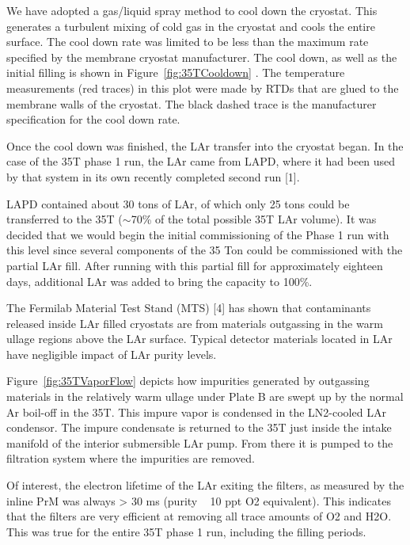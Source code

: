 We have adopted a gas/liquid spray method to cool down the cryostat. This generates a turbulent mixing 
of cold gas in the cryostat and cools the entire surface. The cool down rate was limited to be less than 
the maximum rate specified by the membrane cryostat manufacturer. The cool down, as well as the initial 
filling is shown in Figure~\ref{fig:35TCooldown} . The temperature measurements (red traces) in this plot 
were made by RTDs that are glued to the membrane walls of the cryostat. The black dashed trace is the 
manufacturer specification for the cool down rate.

Once the cool down was finished, the LAr transfer into the cryostat began. In the case of the 35T phase 1 
run, the LAr came from LAPD, where it had been used by that system in its own recently completed 
second run [1]\fixme{}. 

LAPD contained about 30 tons of LAr, of which only 25 tons could be transferred to the 35T ($\sim$70\% of 
the total possible 35T LAr volume). It was decided that we would begin the initial commissioning of the 
Phase 1 run with this level since several components of the 35 Ton could be commissioned with the 
partial LAr fill. After running with this partial fill for approximately eighteen days, additional LAr was 
added to bring the capacity to 100\%. 


The Fermilab Material Test Stand (MTS) [4]\fixme{} has shown that contaminants released inside LAr filled cryostats are from materials outgassing in the warm ullage regions above the LAr surface. Typical detector materials located in LAr have negligible impact of LAr purity levels. 

Figure~\ref{fig:35TVaporFlow} depicts how impurities generated by outgassing materials in the 
relatively warm ullage under Plate B are swept up by the normal Ar boil-off in the 35T. This impure vapor 
is condensed in the LN2-cooled LAr condensor. The impure condensate is returned to the 35T just inside 
the intake manifold of the interior submersible LAr pump. From there it is pumped to the filtration 
system where the impurities are removed.

Of interest, the electron lifetime of the LAr exiting the filters, as measured by the inline PrM was always  
> 30 ms (purity ~ 10 ppt O2 equivalent). This indicates that the filters are very efficient at removing all 
trace amounts of O2 and H2O. This was true for the entire 35T phase 1 run, including the filling periods.

